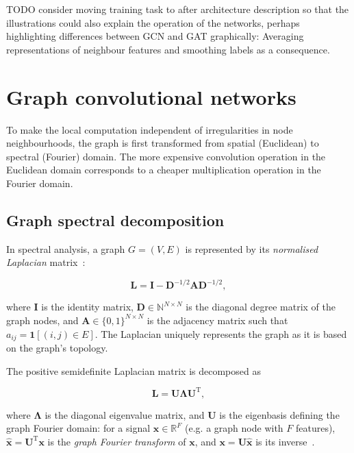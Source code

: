 TODO consider moving training task to after architecture description so that the illustrations could also explain the operation of the networks, perhaps highlighting differences between GCN and GAT graphically: Averaging representations of neighbour features and smoothing labels as a consequence.~\cite{wu2019simplifying}


\section{Graph convolutional networks}
\label{training-gcn}

To make the local computation independent of irregularities in node neighbourhoods, the graph is first transformed from spatial (Euclidean) to spectral (Fourier) domain. The more expensive convolution operation in the Euclidean domain corresponds to a cheaper multiplication operation in the Fourier domain.

\subsection{Graph spectral decomposition}

In spectral analysis, a graph $G = (V, E)$ is represented by its \textit{normalised Laplacian} matrix~\cite{defferrard2016convolutional}: 

\begin{equation}
    \mathbf{L} = \mathbf{I} - \mathbf{D}^{-1/2}\mathbf{A}\mathbf{D}^{-1/2},
\end{equation}

where $\mathbf{I}$ is the identity matrix, $\mathbf{D} \in \mathbb{N}^{N \times N}$ is the diagonal degree matrix of the graph nodes, and $\mathbf{A} \in \{0, 1\}^{N \times N}$ is the adjacency matrix such that $a_{ij} = \mathbf{1}[(i, j) \in E]$. The Laplacian uniquely represents the graph as it is based on the graph's topology.

The positive semidefinite Laplacian matrix is decomposed as

\begin{equation}
    \mathbf{L} = \mathbf{U\Lambda U}^\mathrm{T},
\end{equation}

where $\mathbf{\Lambda}$ is the diagonal eigenvalue matrix, and $\mathbf{U}$ is the eigenbasis defining the graph Fourier domain: for a signal $\mathbf{x} \in \mathbb{R}^{F}$ (e.g. a graph node with $F$ features), $\mathbf{\hat{x}} = \mathbf{U}^\mathrm{T}\mathbf{x}$ is the \textit{graph Fourier transform} of $\mathbf{x}$, and $\mathbf{x} = \mathbf{U}\mathbf{\hat{x}}$ is its inverse~\cite{wu2019simplifying}.

